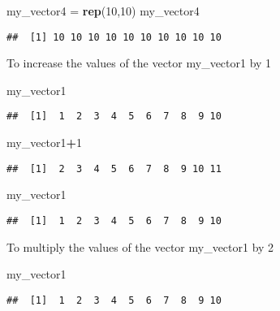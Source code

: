 \documentclass[
]{article}
\newenvironment{Shaded}{\begin{snugshade}}{\end{snugshade}}
\newcommand{\DecValTok}[1]{\textcolor[rgb]{0.00,0.00,0.81}{#1}}
\newcommand{\FunctionTok}[1]{\textcolor[rgb]{0.13,0.29,0.53}{\textbf{#1}}}
\newcommand{\NormalTok}[1]{#1}
\newcommand{\OtherTok}[1]{\textcolor[rgb]{0.56,0.35,0.01}{#1}}
\newcommand{\SpecialCharTok}[1]{\textcolor[rgb]{0.81,0.36,0.00}{\textbf{#1}}}
\begin{document}
\begin{Shaded}
\begin{Highlighting}[]
\NormalTok{my\_vector4 }\OtherTok{=} \FunctionTok{rep}\NormalTok{(}\DecValTok{10}\NormalTok{,}\DecValTok{10}\NormalTok{)}
\NormalTok{my\_vector4}
\end{Highlighting}
\end{Shaded}

\begin{verbatim}
##  [1] 10 10 10 10 10 10 10 10 10 10
\end{verbatim}

To increase the values of the vector my\_vector1 by 1

\begin{Shaded}
\begin{Highlighting}[]
\NormalTok{my\_vector1}
\end{Highlighting}
\end{Shaded}

\begin{verbatim}
##  [1]  1  2  3  4  5  6  7  8  9 10
\end{verbatim}

\begin{Shaded}
\begin{Highlighting}[]
\NormalTok{my\_vector1}\SpecialCharTok{+}\DecValTok{1}
\end{Highlighting}
\end{Shaded}

\begin{verbatim}
##  [1]  2  3  4  5  6  7  8  9 10 11
\end{verbatim}

\begin{Shaded}
\begin{Highlighting}[]
\NormalTok{my\_vector1}
\end{Highlighting}
\end{Shaded}

\begin{verbatim}
##  [1]  1  2  3  4  5  6  7  8  9 10
\end{verbatim}

To multiply the values of the vector my\_vector1 by 2

\begin{Shaded}
\begin{Highlighting}[]
\NormalTok{my\_vector1}
\end{Highlighting}
\end{Shaded}

\begin{verbatim}
##  [1]  1  2  3  4  5  6  7  8  9 10
\end{verbatim}
\end{document}
